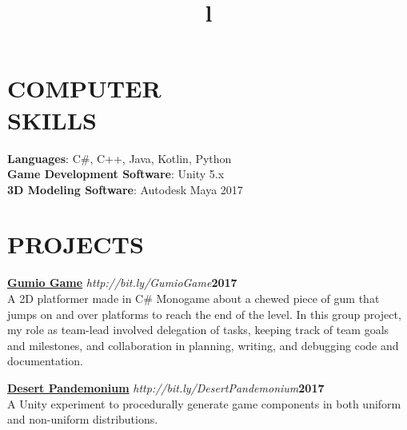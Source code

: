 \documentclass[line,margin]{res}
\begin{document}
\begin{resume}
\section{COMPUTER\\SKILLS}
\textbf{Languages}: C\#, C++, Java, Kotlin, Python\\
\textbf{Game Development Software}: Unity 5.x\\
\textbf{3D Modeling Software}: Autodesk Maya 2017
\section{PROJECTS}
\par
    \href{https://github.com/MaeveMonster/GumioGame}{\textbf{Gumio Game}}
    {\sl http://bit.ly/GumioGame}\hfill \textbf{2017}\\ 
    A 2D platformer made in C\# Monogame about a chewed piece of gum that jumps on and over platforms to 
	reach the end of the level. In this group project, my role as team-lead involved delegation of tasks, keeping track of team goals and milestones, and collaboration in planning, writing, and debugging code and documentation.
	
	\par
    \href{https://github.com/MaeveMonster/DesertPandemonium}{\textbf{Desert Pandemonium}}
    {\sl http://bit.ly/DesertPandemonium}\hfill \textbf{2017}\\ 
    A Unity experiment to procedurally generate game components in both uniform and non-uniform distributions.


\begin{format}
\title{l}\\
\\
\body\\
\end{format}

\end{resume}
\end{document}
